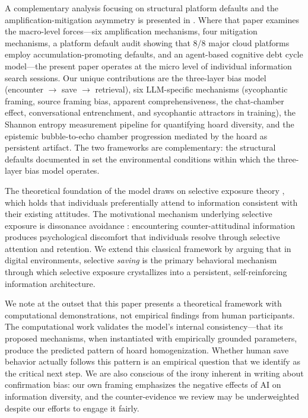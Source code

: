 \documentclass[12pt,a4paper]{article}
\begin{document}
A complementary analysis focusing on structural platform defaults and the amplification-mitigation asymmetry is presented in \citet{Author2026b}.
Where that paper examines the macro-level forces---six amplification mechanisms, four mitigation mechanisms, a platform default audit showing that 8/8 major cloud platforms employ accumulation-promoting defaults, and an agent-based cognitive debt cycle model---the present paper operates at the micro level of individual information search sessions.
Our unique contributions are the three-layer bias model (encounter $\to$ save $\to$ retrieval), six LLM-specific mechanisms (sycophantic framing, source framing bias, apparent comprehensiveness, the chat-chamber effect, conversational entrenchment, and sycophantic attractors in training), the Shannon entropy measurement pipeline for quantifying hoard diversity, and the epistemic bubble-to-echo chamber progression mediated by the hoard as persistent artifact.
The two frameworks are complementary: the structural defaults documented in \citet{Author2026b} set the environmental conditions within which the three-layer bias model operates.

The theoretical foundation of the model draws on selective exposure theory \citep{Klapper1960,Zillmann1985}, which holds that individuals preferentially attend to information consistent with their existing attitudes.
The motivational mechanism underlying selective exposure is dissonance avoidance \citep{Festinger1957}: encountering counter-attitudinal information produces psychological discomfort that individuals resolve through selective attention and retention.
We extend this classical framework by arguing that in digital environments, selective \emph{saving} is the primary behavioral mechanism through which selective exposure crystallizes into a persistent, self-reinforcing information architecture.

We note at the outset that this paper presents a theoretical framework with computational demonstrations, not empirical findings from human participants.
The computational work validates the model's internal consistency---that its proposed mechanisms, when instantiated with empirically grounded parameters, produce the predicted pattern of hoard homogenization.
Whether human save behavior actually follows this pattern is an empirical question that we identify as the critical next step.
We are also conscious of the irony inherent in writing about confirmation bias: our own framing emphasizes the negative effects of AI on information diversity, and the counter-evidence we review may be underweighted despite our efforts to engage it fairly.
\end{document}
